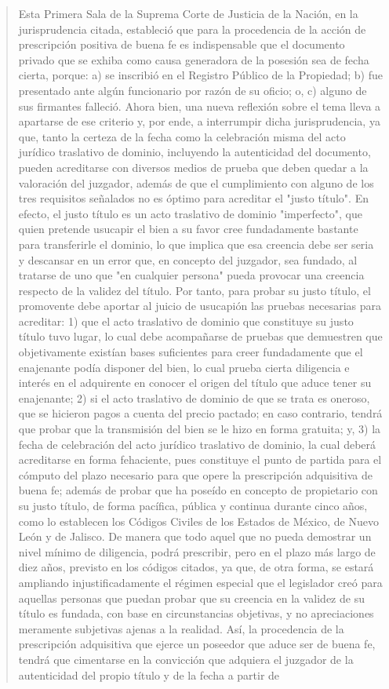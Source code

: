 \documentclass[11pt,a4paper]{article}
\begin{document}
\begin{quote}
Esta Primera Sala de la Suprema Corte de Justicia de la Nación, en la jurisprudencia citada,
estableció que para la procedencia de la acción de prescripción positiva de buena fe es
indispensable que el documento privado que se exhiba como causa generadora de la posesión sea
de fecha cierta, porque: a) se inscribió en el Registro Público de la Propiedad; b) fue presentado
ante algún funcionario por razón de su oficio; o, c) alguno de sus firmantes falleció. Ahora bien, una
nueva reflexión sobre el tema lleva a apartarse de ese criterio y, por ende, a interrumpir dicha
jurisprudencia, ya que, tanto la certeza de la fecha como la celebración misma del acto jurídico
traslativo de dominio, incluyendo la autenticidad del documento, pueden acreditarse con diversos
medios de prueba que deben quedar a la valoración del juzgador, además de que el cumplimiento
con alguno de los tres requisitos señalados no es óptimo para acreditar el "justo título". En efecto, el
justo título es un acto traslativo de dominio "imperfecto", que quien pretende usucapir el bien a su
favor cree fundadamente bastante para transferirle el dominio, lo que implica que esa creencia debe
ser seria y descansar en un error que, en concepto del juzgador, sea fundado, al tratarse de uno
que "en cualquier persona" pueda provocar una creencia respecto de la validez del título. Por tanto,
para probar su justo título, el promovente debe aportar al juicio de usucapión las pruebas necesarias
para acreditar: 1) que el acto traslativo de dominio que constituye su justo título tuvo lugar, lo cual
debe acompañarse de pruebas que demuestren que objetivamente existían bases suficientes para
creer fundadamente que el enajenante podía disponer del bien, lo cual prueba cierta diligencia e
interés en el adquirente en conocer el origen del título que aduce tener su enajenante; 2) si el acto
traslativo de dominio de que se trata es oneroso, que se hicieron pagos a cuenta del precio pactado;
en caso contrario, tendrá que probar que la transmisión del bien se le hizo en forma gratuita; y, 3) la
fecha de celebración del acto jurídico traslativo de dominio, la cual deberá acreditarse en forma
fehaciente, pues constituye el punto de partida para el cómputo del plazo necesario para que opere
la prescripción adquisitiva de buena fe; además de probar que ha poseído en concepto de
propietario con su justo título, de forma pacífica, pública y continua durante cinco años, como lo
establecen los Códigos Civiles de los Estados de México, de Nuevo León y de Jalisco. De manera
que todo aquel que no pueda demostrar un nivel mínimo de diligencia, podrá prescribir, pero en el
plazo más largo de diez años, previsto en los códigos citados, ya que, de otra forma, se estará
ampliando injustificadamente el régimen especial que el legislador creó para aquellas personas que
puedan probar que su creencia en la validez de su título es fundada, con base en circunstancias
objetivas, y no apreciaciones meramente subjetivas ajenas a la realidad. Así, la procedencia de la
prescripción adquisitiva que ejerce un poseedor que aduce ser de buena fe, tendrá que cimentarse
en la convicción que adquiera el juzgador de la autenticidad del propio título y de la fecha a partir de



\end{quote}
\end{document}
